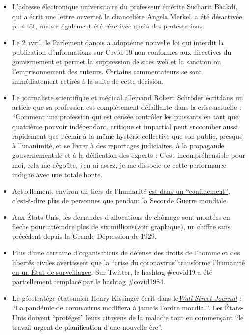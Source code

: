 \begin{itemize}
\tightlist
\item
  L'adresse électronique universitaire du professeur émérite Sucharit
  Bhakdi, qui a écrit
  \href{https://swprs.org/open-letter-from-professor-sucharit-bhakdi-to-german-chancellor-dr-angela-merkel/}{une
  lettre ouverte}à la chancelière Angela Merkel, a été désactivée plus
  tôt, mais a également été réactivée après des protestations.
\item
  Le 2 avril, le Parlement danois a
  adopté\href{https://newsvoice.se/2020/04/danmark-forbjuder-corona-policy/}{une
  nouvelle loi} qui interdit la publication d'informations sur Covid-19
  non conformes aux directives du gouvernement et permet la suppression
  de sites web et la sanction ou l'emprisonnement des auteurs. Certains
  commentateurs se sont immédiatement retirés à la suite de cette
  décision.
\item
  Le journaliste scientifique et médical allemand Robert Schröder
  écritdans un article que sa profession est complètement défaillante
  dans la crise actuelle : ``Comment une profession qui est censée
  contrôler les puissants en tant que quatrième pouvoir indépendant,
  critique et impartial peut succomber aussi rapidement que l'éclair à
  la même hystérie collective que son public, presque à l'unanimité, et
  se livrer à des reportages judiciaires, à la propagande
  gouvernementale et à la déification des experts : C'est
  incompréhensible pour moi, cela me dégoûte, j'en ai assez, je me
  dissocie de cette performance indigne avec une totale honte.
\item
  Actuellement, environ un tiers de l'humanité
  \href{https://www.sciencealert.com/one-third-of-the-world-s-population-are-now-restricted-in-where-they-can-go}{est
  dans un ``confinement''}, c'est-à-dire plus de personnes que pendant
  la Seconde Guerre mondiale.
\item
  Aux États-Unis, les demandes d'allocations de chômage sont montées en
  flèche pour atteindre
  \href{https://www.reuters.com/article/us-health-coronavirus-usa-layoffs/us-weekly-jobless-claims-seen-at-record-high-again-idUSKBN21K0FX}{plus
  de six millions}(voir graphique), un chiffre sans précédent depuis la
  Grande Dépression de 1929.
\item
  Plus d'une centaine d'organisations de défense des droits de l'homme
  et des libertés civiles avertissent que la ``crise du
  coronavirus''\href{https://www.dailymail.co.uk/news/article-8181381/World-sleepwalking-surveillance-state-rights-groups-warn.html}{transforme
  l'humanité en un État de surveillance}. Sur Twitter, le hashtag
  \#covid19 a été partiellement remplacé par le hashtag \#covid1984.
\item
  Le géostratège étatsunien Henry Kissinger écrit dans
  le\href{https://www.wsj.com/articles/the-coronavirus-pandemic-will-forever-alter-the-world-order-11585953005}{\emph{Wall
  Street Journal}} : ``La pandémie de coronavirus modifiera à jamais
  l'ordre mondial''. Les États-Unis doivent ``protéger'' leurs citoyens
  de la maladie tout en commençant ``le travail urgent de planification
  d'une nouvelle ère''.
\end{itemize}

